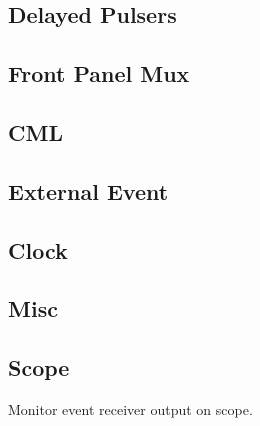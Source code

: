 \documentclass[a4paper,10pt]{article}
\begin{document}
	\subsection{Delayed Pulsers}
	\subsection{Front Panel Mux}
	\subsection{CML}
	\subsection{External Event}
	\subsection{Clock}
	\subsection{Misc}
	\subsection{Scope}
	Monitor event receiver output on scope.
\end{document}
